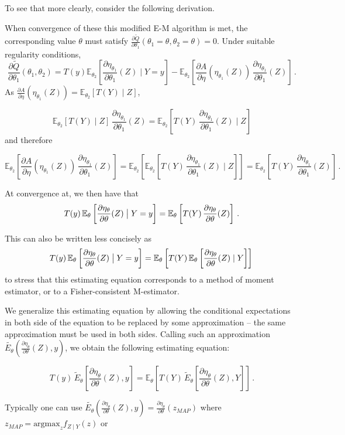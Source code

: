 \documentclass[twoside,11pt]{article}
\newcommand{\fracpartial}[2]{\frac{\partial #1}{\partial  #2}}
\newcommand{\E}{{\mathbb{E}}}
\newcommand{\te}{{\theta}}
\begin{document}
To see that more clearly, consider the following derivation. 

When convergence of these this modified E-M algorithm is met, the corresponding value $\theta$ must satisfy
 $\fracpartial{\tilde{Q}}{\te_1}(\te_1 = \te,\te_2 = \te) = 0$.
Under suitable regularity conditions, 
$$\fracpartial{\tilde{Q}}{\te_1}(\te_1, \te_2) = T(y) \E_{\te_2}\left[ \fracpartial{\eta_{\te_1}}{\te_1}(Z)\mid Y = y \right] - \E_{\te_2} \left[ \fracpartial{A}{\eta}(\eta_{\te_1}(Z)) \,\fracpartial{\eta_{\te_1}}{\te_1}(Z) \right] \,.$$ 
As $\fracpartial{A}{\eta}(\eta_{\te_1}(Z)) = \E_{\te_2}\left[T(Y)\mid Z\right]$, 

$$\E_{\te_2}\left[T(Y)\mid Z\right] \,\fracpartial{\eta_{\te_1}}{\te_1}(Z) = \E_{\te_2}\left[T(Y) \,\fracpartial{\eta_{\te_1}}{\te_1}(Z) \mid Z\right]$$
and therefore

$$\E_{\te_2} \left[ \fracpartial{A}{\eta}(\eta_{\te_1}(Z)) \,\fracpartial{\eta_{\te_1}}{\te_1}(Z) \right] = \E_{\te_2}\left[ \E_{\te_2}\left[T(Y) \,\fracpartial{\eta_{\te_1}}{\te_1}(Z) \mid Z\right] \right] = \E_{\te_2}\left[T(Y) \,\fracpartial{\eta_{\te_1}}{\te_1}(Z) \right] \, .$$

At convergence at, we then have that 
$$ T(y) \, \E_\theta\left[ \fracpartial{\eta_\theta}{\theta}(Z) \bigm\vert Y = y \right] = \E_\theta\left[ T(Y) \, \fracpartial{\eta_\theta}{\theta}(Z) \right] \, .$$

This can also be written less concisely as 
$$ T(y) \, \E_\theta\left[ \fracpartial{\eta_\theta}{\theta}(Z) \bigm\vert Y = y \right] = \E_\theta\left[ T(Y) \, \E_\theta\left[ \fracpartial{\eta_\theta}{\theta}(Z) \mid Y\right] \right] \, $$
to stress that this estimating equation corresponds to a method of moment estimator, or to a Fisher-consistent M-estimator.

We generalize this estimating equation by allowing the conditional expectations in both side of the equation to be replaced by some approximation -- the same approximation must be used in both sides. Calling such an approximation $\tilde{E_\theta}(\fracpartial{\eta_\theta}{\theta}(Z), y)$, we obtain the following estimating equation:

$$ T(y) \, \tilde{E}_\theta\left[ \fracpartial{\eta_\theta}{\theta}(Z) , y \right] = \E_\theta\left[ T(Y) \, \tilde{E}_\theta\left[ \fracpartial{\eta_\theta}{\theta}(Z) , Y\right] \right] \, .$$


Typically one can use $\tilde{E_\theta}(\fracpartial{\eta_\theta}{\theta}(Z), y) = \fracpartial{\eta_\theta}{\theta}(z_{MAP})$ where $z_{MAP} = \textrm{argmax}_z f_{Z \mid Y}(z)$ or
\end{document}
